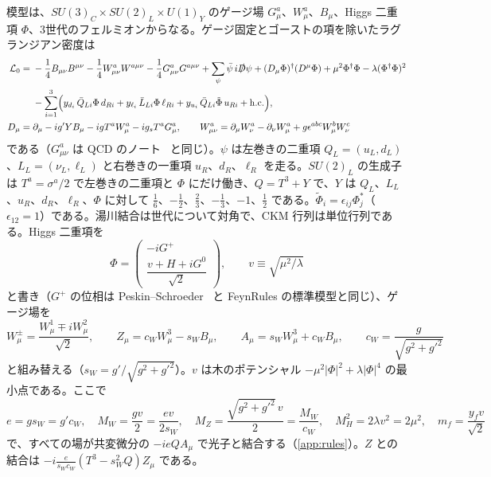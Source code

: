 \documentclass[a4paper,10pt]{ltjsarticle}
\newcommand{\sw}{s_W}
\newcommand{\cw}{c_W}
\begin{document}
模型は、$SU(3)_C\times SU(2)_L\times U(1)_Y$ のゲージ場 $G^a_\mu$、$W^a_\mu$、$B_\mu$、Higgs 二重項 $\Phi$、3世代のフェルミオンからなる。ゲージ固定とゴーストの項を除いたラグランジアン密度は
\begin{equation}
\begin{aligned}
\mathcal L_0={}&-\frac14B_{\mu\nu}B^{\mu\nu}-\frac14W^a_{\mu\nu}W^{a\mu\nu}-\frac14G^a_{\mu\nu}G^{a\mu\nu}
+\sum_{\psi}\bar\psi\,i\slashed D\psi
+(D_\mu\Phi)^\dagger(D^\mu\Phi)+\mu^2\Phi^\dagger\Phi-\lambda(\Phi^\dagger\Phi)^2\\
&-\sum_{i=1}^3\Bigl(y_{d_i}\,\bar Q_{Li}\Phi\,d_{Ri}+y_{\ell_i}\,\bar L_{Li}\Phi\,\ell_{Ri}+y_{u_i}\,\bar Q_{Li}\tilde\Phi\,u_{Ri}+\mathrm{h.c.}\Bigr),\\
D_\mu={}&\partial_\mu-ig'YB_\mu-igT^aW^a_\mu-ig_sT^aG^a_\mu,\qquad
W^a_{\mu\nu}=\partial_\mu W^a_\nu-\partial_\nu W^a_\mu+g\epsilon^{abc}W^b_\mu W^c_\nu
\end{aligned}
\label{eq:L}
\end{equation}
である（$G^a_{\mu\nu}$ は QCD のノート~\cite{qcdnote} と同じ）。$\psi$ は左巻きの二重項 $Q_L=(u_L,d_L)$、$L_L=(\nu_L,\ell_L)$ と右巻きの一重項 $u_R$、$d_R$、$\ell_R$ を走る。$SU(2)_L$ の生成子は $T^a=\sigma^a/2$ で左巻きの二重項と $\Phi$ にだけ働き、$Q=T^3+Y$ で、$Y$ は $Q_L$、$L_L$、$u_R$、$d_R$、$\ell_R$、$\Phi$ に対して $\frac16$、$-\frac12$、$\frac23$、$-\frac13$、$-1$、$\frac12$ である。$\tilde\Phi_i=\epsilon_{ij}\Phi_j^*$（$\epsilon_{12}=1$）である。湯川結合は世代について対角で、CKM 行列は単位行列である。Higgs 二重項を
\begin{equation}
\Phi=\begin{pmatrix}-iG^+\\[2pt] \dfrac{v+H+iG^0}{\sqrt2}\end{pmatrix},\qquad v\equiv\sqrt{\mu^2/\lambda}
\label{eq:Phi}
\end{equation}
と書き（$G^+$ の位相は Peskin--Schroeder~\cite{peskin} と FeynRules の標準模型と同じ）、ゲージ場を
\begin{equation}
W^\pm_\mu=\frac{W^1_\mu\mp iW^2_\mu}{\sqrt2},\qquad
Z_\mu=\cw W^3_\mu-\sw B_\mu,\qquad A_\mu=\sw W^3_\mu+\cw B_\mu,\qquad
\cw=\frac{g}{\sqrt{g^2+g'^2}}
\label{eq:fields}
\end{equation}
と組み替える（$\sw=g'/\sqrt{g^2+g'^2}$）。$v$ は木のポテンシャル $-\mu^2|\Phi|^2+\lambda|\Phi|^4$ の最小点である。ここで
\begin{equation}
e=g\sw=g'\cw,\quad M_W=\frac{gv}{2}=\frac{ev}{2\sw},\quad M_Z=\frac{\sqrt{g^2+g'^2}\,v}{2}=\frac{M_W}{\cw},\quad M_H^2=2\lambda v^2=2\mu^2,\quad m_f=\frac{y_fv}{\sqrt2}
\label{eq:masses}
\end{equation}
で、すべての場が共変微分の $-ieQA_\mu$ で光子と結合する（\ref{app:rules}）。$Z$ との結合は $-i\frac{e}{\sw\cw}(T^3-\sw^2Q)Z_\mu$ である。
\end{document}
